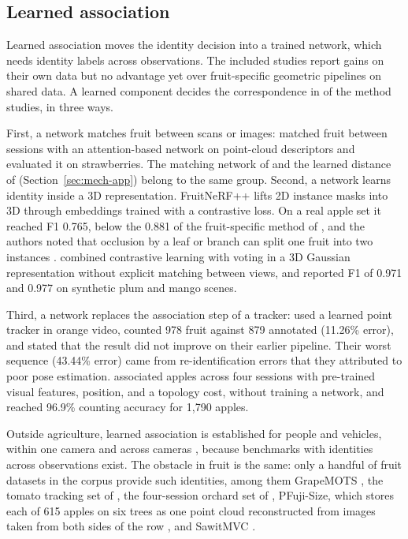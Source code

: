 \subsection{Learned association}\label{sec:mech-learn}
Learned association moves the identity decision into a trained network, which needs identity labels across observations. The included studies report gains on their own data but no advantage yet over fruit-specific geometric pipelines on shared data. A learned component decides the correspondence in \nLearn of the \nMethod method studies, in three ways.

First, a network matches fruit between scans or images: \citet{fusaro2026horticultural} matched fruit between sessions with an attention-based network on point-cloud descriptors and evaluated it on strawberries. The matching network of \citet{xia2022culling} and the learned distance of \citet{zheng2023object} (Section~\ref{sec:mech-app}) belong to the same group. Second, a network learns identity inside a 3D representation. FruitNeRF++ lifts 2D instance masks into 3D through embeddings trained with a contrastive loss. On a real apple set it reached F1 0.765, below the 0.881 of the fruit-specific method of \citet{genemola2020fruitb}, and the authors noted that occlusion by a leaf or branch can split one fruit into two instances \citep{meyer2025fruitnerf}. \citet{zhao2026adapting} combined contrastive learning with voting in a 3D Gaussian representation without explicit matching between views, and reported F1 of 0.971 and 0.977 on synthetic plum and mango scenes.

Third, a network replaces the association step of a tracker: \citet{santos2026multi} used a learned point tracker in orange video, counted 978 fruit against 879 annotated (11.26\% error), and stated that the result did not improve on their earlier pipeline. Their worst sequence (43.44\% error) came from re-identification errors that they attributed to poor pose estimation. \citet{lei2025spatio} associated apples across four sessions with pre-trained visual features, position, and a topology cost, without training a network, and reached 96.9\% counting accuracy for 1{,}790 apples.

Outside agriculture, learned association is established for people and vehicles, within one camera \citep{braso2020learning} and across cameras \citep{ristani2016performance,tang2019cityflow}, because benchmarks with identities across observations exist. The obstacle in fruit is the same: only a handful of fruit datasets in the corpus provide such identities, among them GrapeMOTS \citep{arizasentis2024grapemots}, the tomato tracking set of \citet{qi2025assessment}, the four-session orchard set of \citet{lei2025spatio}, PFuji-Size, which stores each of 615 apples on six trees as one point cloud reconstructed from images taken from both sides of the row \citep{genemola2021pfuji}, and SawitMVC \citep{indriani2026sawitmvc}.

